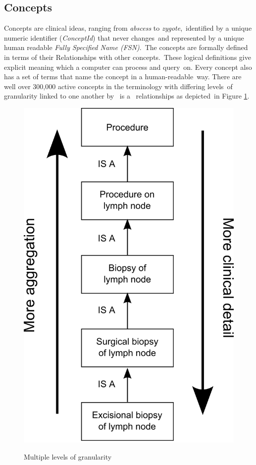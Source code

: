 \documentclass[DIV=calc, paper=a4, fontsize=12pt, onecolumn]{scrartcl}	 %
\begin{document}
\subsection{Concepts}
  Concepts are clinical ideas, ranging from \emph{abscess} to \emph{zygote},\
  identified by a unique numeric identifier (\textit{ConceptId}) that never changes\
  and represented by a unique human readable \textit{Fully Specified Name (FSN)}.\
  The concepts are formally defined in terms of their Relationships with other concepts.\
  These logical definitions give explicit meaning which a computer can process and query\
  on. Every concept also has a set of terms that name the concept in a human-readable\
  way. There are well over 300,000 active concepts in the terminology with differing levels\
  of granularity linked to one another by \textbar ~is a \textbar ~relationships as depicted\
  in Figure \ref{fig:snomedct_concepts_granularity}. 
    \begin{figure}[h!]
    \centering
    \includegraphics[scale=1]{granularity.png}
    \caption{Multiple levels of granularity}\cite[Fig.~1]{snomed_-_user_guide_snomed_2011}
    \label{fig:snomedct_concepts_granularity}
  \end{figure}
\end{document}
